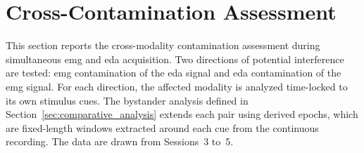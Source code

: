 \section{Cross-Contamination Assessment}
\label{sec:results-crosscontamination}

This section reports the cross-modality contamination assessment during simultaneous \gls{emg} and \gls{eda} acquisition. Two directions of potential interference are tested: \gls{emg} contamination of the \gls{eda} signal and \gls{eda} contamination of the \gls{emg} signal. For each direction, the affected modality is analyzed time-locked to its own stimulus cues. The bystander analysis defined in Section~\ref{sec:comparative_analysis} extends each pair using derived epochs, which are fixed-length windows extracted around each cue from the continuous recording. The data are drawn from Sessions~3 to~5.

 
 
%
%
%
%
 

